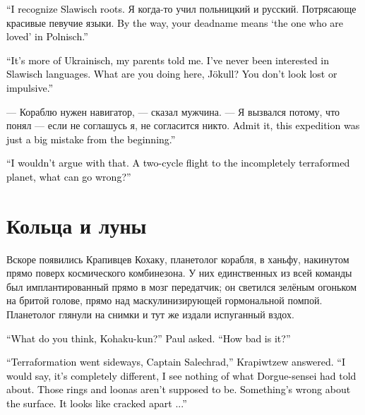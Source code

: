 \documentclass[a4paper,10pt,fleqn]{book}\usepackage{polyglossia}\setdefaultlanguage{english}\setotherlanguage{russian}\defaultfontfeatures{Ligatures=TeX,Mapping=tex-text}\usepackage{xcolor}\definecolor{lightgray}{HTML}{bbbbbb}\color{lightgray}\newcommand{\ml}[3]{\textcolor{black}{#3}}
\begin{document}
\ml{$0$}
{--- Чую славицкие корни.}
{``I recognize Slawisch roots.}
Я когда-то учил польницкий и русский.
Потрясающе красивые певучие языки.
\ml{$0$}
{Кстати, твоя старая фамилия на польницком означает <<тот, кого любят>>.}
{By the way, your deadname means `the one who are loved' in Polnisch.''}

\ml{$0$}
{--- Она скорее украйницкая, как мне говорили родители.}
{``It's more of Ukrainisch, my parents told me.}
\ml{$0$}
{Никогда не интересовалась славицкими языками.}
{I've never been interested in Slawisch languages.}
\ml{$0$}
{А что ты здесь делаешь, Йокудль?}
{What are you doing here, Jökull?}
\ml{$0$}
{Ты не выглядишь потерянным или импульсивным.}
{You don't look lost or impulsive.''}

--- Кораблю нужен навигатор, --- сказал мужчина.
--- Я вызвался потому, что понял --- если не соглашусь я, не согласится никто.
\ml{$0$}
{Признай --- эта экспедиция изначально была ошибкой.}
{Admit it, this expedition was just a big mistake from the beginning.''}

\ml{$0$}
{--- Даже не буду спорить.}
{``I wouldn't argue with that.}
\ml{$0$}
{Лететь с двумя циклами к недотерраформированной планете --- что может пойти не так?}
{A two-cycle flight to the incompletely terraformed planet, what can go wrong?''}

\section{Кольца и луны}

Вскоре появились Крапивцев Кохаку, планетолог корабля, в ханьфу, накинутом прямо поверх космического комбинезона.
У них единственных из всей команды был имплантированный прямо в мозг передатчик;
он светился зелёным огоньком на бритой голове, прямо над маскулинизирующей гормональной помпой. 
Планетолог глянули на снимки и тут же издали испуганный вздох.

\ml{$0$}
{--- Что скажешь, Кохаку-кун? --- спросил Пауль.}
{``What do you think, Kohaku-kun?'' Paul asked.}
\ml{$0$}
{--- Всё плохо?}
{``How bad is it?''}

\ml{$0$}
{--- Терраформирование прошло не по плану, капитан Салехрад, --- ответили Крапивцев.}
{``Terraformation went sideways, Captain Salechrad,'' Krapiwtzew answered.}
\ml{$0$}
{--- Я бы сказали, она совсем другая, я не вижу ничего из того, о чём говорил Дорге-сенсей.}
{``I would say, it's completely different, I see nothing of what Dorgue-sensei had told about.}
\ml{$0$}
{Вот этиx колец и лун быть не должно.}
{Those rings and loonas aren't supposed to be.}
\ml{$0$}
{С поверхностью что-то не так.}
{Something's wrong about the surface.}
\ml{$0$}
{Она как будто растрескалась на куски...}
{It looks like cracked apart ...''}
\end{document}
